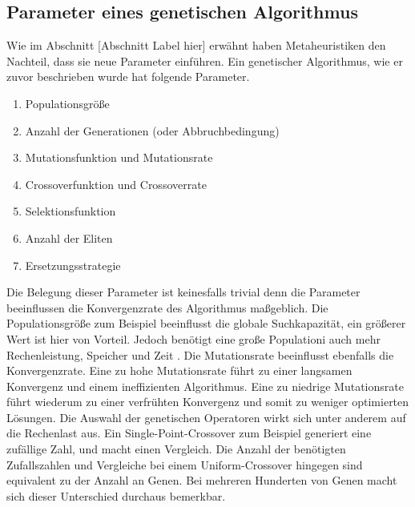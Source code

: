\subsection*{Parameter eines genetischen Algorithmus}
Wie im Abschnitt [Abschnitt Label hier] erwähnt haben Metaheuristiken den Nachteil, dass sie neue Parameter einführen. Ein genetischer Algorithmus, wie er zuvor beschrieben wurde hat folgende Parameter.
\begin{enumerate}
    \item Populationsgröße
    \item Anzahl der Generationen (oder Abbruchbedingung)
    \item Mutationsfunktion und Mutationsrate
    \item Crossoverfunktion und Crossoverrate
    \item Selektionsfunktion
    \item Anzahl der Eliten
    \item Ersetzungsstrategie
\end{enumerate}
Die Belegung dieser Parameter ist keinesfalls trivial denn die Parameter beeinflussen die Konvergenzrate des Algorithmus maßgeblich. Die Populationsgröße zum Beispiel beeinflusst die globale Suchkapazität, ein größerer Wert ist hier von Vorteil. Jedoch benötigt eine große Populationi auch mehr Rechenleistung, Speicher und Zeit \cite*{TerminologiesAndOperators}. Die Mutationsrate beeinflusst ebenfalls die Konvergenzrate. Eine zu hohe Mutationsrate führt zu einer langsamen Konvergenz und einem ineffizienten Algorithmus. Eine zu niedrige Mutationsrate führt wiederum zu einer verfrühten Konvergenz und somit zu weniger optimierten Lösungen. Die Auswahl der genetischen Operatoren wirkt sich unter anderem auf die Rechenlast aus. Ein Single-Point-Crossover zum Beispiel generiert eine zufällige Zahl, und macht einen Vergleich. Die Anzahl der benötigten Zufallszahlen und Vergleiche bei einem Uniform-Crossover hingegen sind equivalent zu der Anzahl an Genen. Bei mehreren Hunderten von Genen macht sich dieser Unterschied durchaus bemerkbar.